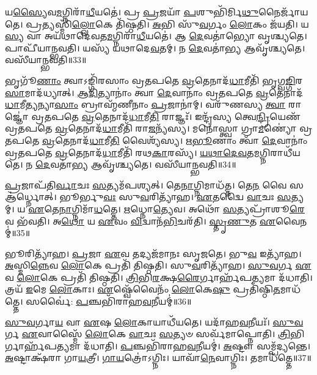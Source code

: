 𑌯\-\ul{𑌸𑍍𑌯𑍈}\-𑌵\-\ul{𑌮}\-𑌗𑍍𑌨𑌿𑌰𑌾᳴\-\ul{𑌧𑍀}\-𑌯𑌤𑍇॑।
𑌪𑍍𑌰 \ul{𑌪𑍍𑌰}\-𑌜𑌯𑌾᳴ \ul{𑌪}\-𑌶𑍁𑌭𑌿᳴𑌰𑍍𑌮𑌿\-\ul{𑌥𑍁}\-𑌨𑍈𑌰𑍍𑌜𑌾᳴𑌯𑌤𑍇।
𑌪𑍍𑌰\-\ul{𑌤𑍍𑌯}\-𑌸𑍍𑌮𑌿𑌁\-\ul{𑌲𑍍𑌲𑍋}\-𑌕𑍇 𑌤𑌿᳴𑌷𑍍𑌠𑌤𑌿।
\-\ul{𑌅}\-𑌭𑌿 𑌸𑍁᳴\-\ul{𑌵}\-𑌰𑍍𑌗𑌂 \ul{𑌲𑍋}\-𑌕𑌂 𑌜᳴𑌯𑌤𑌿।
𑌯\-\ul{𑌸𑍍𑌯} 𑌵𑌾 𑌅𑌯᳴𑌥𑌾𑌦𑍇𑌵𑌤\-\ul{𑌮}\-𑌗𑍍𑌨𑌿𑌰𑌾᳴\-\ul{𑌧𑍀}\-𑌯𑌤𑍇॑।
𑌆 \ul{𑌦𑍇}\-𑌵𑌤𑌾॑𑌭𑍍𑌯𑍋 𑌵𑍃𑌶𑍍𑌚𑍍𑌯𑌤𑍇।
𑌪𑌾𑌪𑍀᳴𑌯𑌾𑌨𑍍𑌭𑌵𑌤𑌿।
𑌯𑌸𑍍𑌯᳴ 𑌯𑌥𑌾𑌦𑍇\-\ul{𑌵}\-𑌤𑌮𑍍।
𑌨 \ul{𑌦𑍇}\-𑌵𑌤𑌾॑\-\ul{𑌭𑍍𑌯} 𑌆𑌵𑍃᳴𑌶𑍍𑌚𑍍𑌯𑌤𑍇।
𑌵𑌸𑍀᳴𑌯𑌾𑌨𑍍𑌭𑌵𑌤𑌿॥33॥

𑌭𑍃𑌗𑍂᳴\-\ul{𑌣𑌾𑌂} 𑌤𑍍𑌵𑌾\-𑌽𑌙𑍍𑌗𑌿᳴𑌰𑌸𑌾𑌂 𑌵𑍍𑌰𑌤𑌪𑌤𑍇 \ul{𑌵𑍍𑌰}\-𑌤𑍇𑌨𑌾𑌦᳴\-\ul{𑌧𑌾}\-𑌮𑍀𑌤𑌿᳴ 𑌭𑍃𑌗𑍍𑌵\-\ul{𑌙𑍍𑌗𑌿}\-𑌰\-\ul{𑌸𑌾}\-\-𑌮𑌾𑌦᳴𑌧𑍍𑌯𑌾𑌤𑍍।
\-\ul{𑌆}\-\-\ul{𑌦𑌿}\-𑌤𑍍𑌯𑌾𑌨𑌾𑌂॑ 𑌤𑍍𑌵𑌾 \ul{𑌦𑍇}\-𑌵𑌾𑌨𑌾𑌂॑ 𑌵𑍍𑌰𑌤𑌪𑌤𑍇 \ul{𑌵𑍍𑌰}\-𑌤𑍇𑌨𑌾𑌦᳴\-\ul{𑌧𑌾}\-𑌮𑍀\-\-\ul{𑌤𑍍𑌯}\-𑌨𑍍𑌯𑌾\-\ul{𑌸𑌾𑌂} 𑌬𑍍𑌰𑌾𑌹𑍍𑌮᳴𑌣𑍀𑌨𑌾𑌂 \ul{𑌪𑍍𑌰}\-𑌜𑌾𑌨𑌾॑𑌮𑍍।
𑌵𑌰𑍁᳴𑌣𑌸𑍍𑌯 \ul{𑌤𑍍𑌵𑌾} 𑌰𑌾𑌜𑍍𑌞𑍋॑ 𑌵𑍍𑌰𑌤𑌪𑌤𑍇 \ul{𑌵𑍍𑌰}\-𑌤𑍇𑌨𑌾𑌦᳴\-\ul{𑌧𑌾}\-𑌮𑍀\-\ul{𑌤𑌿} 𑌰𑌾𑌜𑍍𑌞𑌃᳴।
𑌇𑌨𑍍𑌦𑍍𑌰᳴𑌸𑍍𑌯 𑌤𑍍𑌵𑍇\-\ul{𑌨𑍍𑌦𑍍𑌰𑌿}\-𑌯𑍇𑌣᳴ 𑌵𑍍𑌰𑌤𑌪𑌤𑍇 \ul{𑌵𑍍𑌰}\-𑌤𑍇𑌨𑌾𑌦᳴\-\ul{𑌧𑌾}\-𑌮𑍀𑌤𑌿᳴ 𑌰𑌾\-\ul{𑌜}\-𑌨𑍍𑌯᳴𑌸𑍍𑌯।
𑌮𑌨𑍋॑𑌸𑍍𑌤𑍍𑌵𑌾 𑌗𑍍𑌰𑌾\-\ul{𑌮}\-𑌣𑍍𑌯𑍋॑ 𑌵𑍍𑌰𑌤𑌪𑌤𑍇 \ul{𑌵𑍍𑌰}\-𑌤𑍇𑌨𑌾𑌦᳴\-\ul{𑌧𑌾}\-𑌮𑍀\-\ul{𑌤𑌿} 𑌵𑍈𑌶𑍍𑌯᳴𑌸𑍍𑌯।
\-\ul{𑌋}\-\-\ul{𑌭𑍂}\-𑌣𑌾𑌂 𑌤𑍍𑌵𑌾᳴ \ul{𑌦𑍇}\-𑌵𑌾𑌨𑌾𑌂॑ 𑌵𑍍𑌰𑌤𑌪𑌤𑍇 \ul{𑌵𑍍𑌰}\-𑌤𑍇𑌨𑌾𑌦᳴\-\ul{𑌧𑌾}\-𑌮𑍀𑌤𑌿᳴ 𑌰𑌥\-\ul{𑌕𑌾}\-𑌰𑌸𑍍𑌯᳴।
\-\ul{𑌯}\-\-\ul{𑌥𑌾}\-\-\ul{𑌦𑍇}\-\-\ul{𑌵}\-𑌤\-\ul{𑌮}\-𑌗𑍍𑌨𑌿𑌰𑌾𑌧𑍀᳴𑌯𑌤𑍇।
𑌨 \ul{𑌦𑍇}\-𑌵𑌤𑌾॑\-\ul{𑌭𑍍𑌯} 𑌆𑌵𑍃᳴𑌶𑍍𑌚𑍍𑌯𑌤𑍇।
𑌵𑌸𑍀᳴𑌯𑌾𑌨𑍍𑌭𑌵𑌤𑌿॥34॥\anuvakamend[\-\ul{𑌧𑍍𑌯𑌾}\-\-\ul{𑌯}\-\-\ul{𑌤𑌿} 𑌵𑍈 𑌰𑌾\-\ul{𑌤𑍍𑌰𑌿}\-𑌶𑍍𑌚𑌾𑌵᳴ 𑌰𑍁𑌨𑍍𑌧𑍇 𑌭𑌵𑌿\-\ul{𑌷𑍍𑌯}\-𑌨𑍍𑌤𑍀𑌤𑍍𑌯᳴𑌬𑍍𑌰𑌵𑍀𑌜𑍍𑌜\-\ul{𑌨𑌿}\-𑌷𑍍𑌯𑌸𑍇᳴\-𑌽𑌜\-\ul{𑌯}\-𑌦𑍍𑌵𑌸𑍀᳴𑌯𑌾𑌨𑍍𑌭𑌵\-\ul{𑌤𑌿} 𑌨𑌵᳴ 𑌚]

\-\ul{𑌪𑍍𑌰}\-𑌜𑌾𑌪᳴𑌤𑌿\-\ul{𑌰𑍍𑌵𑌾}\-𑌚𑌃 \ul{𑌸}\-𑌤𑍍𑌯𑌮᳴𑌪𑌶𑍍𑌯𑌤𑍍।
𑌤𑍇\-\ul{𑌨𑌾}\-𑌗𑍍𑌨𑌿𑌮𑌾𑌧᳴𑌤𑍍𑌤।
𑌤𑍇\-\ul{𑌨} 𑌵𑍈 𑌸 𑌆॑𑌰𑍍𑌧𑍍𑌨𑍋𑌤𑍍।
𑌭𑍂𑌰𑍍𑌭𑍁\-\ul{𑌵𑌃} 𑌸𑍁\-\ul{𑌵}\-𑌰𑌿𑌤𑍍𑌯𑌾᳴𑌹।
\-\ul{𑌏}\-𑌤𑌦𑍍𑌵𑍈 \ul{𑌵𑌾}\-𑌚𑌃 \ul{𑌸}\-𑌤𑍍𑌯𑌮𑍍।
𑌯 \ul{𑌏}\-𑌤𑍇\-\ul{𑌨𑌾}\-𑌗𑍍𑌨𑌿𑌮𑌾᳴\-\ul{𑌧}\-𑌤𑍍𑌤𑍇।
\-\ul{𑌋}\-𑌧𑍍𑌨𑍋\-\ul{𑌤𑍍𑌯𑍇}\-𑌵।
𑌅𑌥𑍋᳴ \ul{𑌸}\-𑌤𑍍𑌯𑌪𑍍𑌰𑌾᳴𑌶𑍂\-\ul{𑌰𑍇}\-𑌵 𑌭᳴𑌵𑌤𑌿।
𑌅\-\ul{𑌥𑍋} 𑌯 \ul{𑌏}\-𑌵𑌂 \ul{𑌵𑌿}\-𑌦𑍍𑌵𑌾𑌨᳴\-\ul{𑌭𑌿}\-𑌚𑌰᳴𑌤𑌿।
\-\ul{𑌸𑍍𑌤𑍃}\-\-\ul{𑌣𑍁}\-𑌤 \ul{𑌏}\-𑌵𑍈𑌨𑌮𑍍॑॥35॥

𑌭𑍂𑌰𑌿𑌤𑍍𑌯𑌾᳴𑌹।
\-\ul{𑌪𑍍𑌰}\-𑌜𑌾 \ul{𑌏}\-𑌵 𑌤𑌦𑍍𑌯𑌜᳴𑌮𑌾𑌨𑌃 𑌸𑍃𑌜𑌤𑍇।
𑌭𑍁\-\ul{𑌵} 𑌇𑌤𑍍𑌯𑌾᳴𑌹।
\-\ul{𑌅}\-𑌸𑍍𑌮𑌿\-\ul{𑌨𑍍𑌨𑍇}\-𑌵 \ul{𑌲𑍋}\-𑌕𑍇 𑌪𑍍𑌰𑌤𑌿᳴ 𑌤𑌿𑌷𑍍𑌠𑌤𑌿।
𑌸𑍁\-\ul{𑌵}\-𑌰𑌿𑌤𑍍𑌯𑌾᳴𑌹।
\-\ul{𑌸𑍁}\-\-\ul{𑌵}\-𑌰𑍍𑌗 \ul{𑌏}\-𑌵 \ul{𑌲𑍋}\-𑌕𑍇 𑌪𑍍𑌰𑌤𑌿᳴ 𑌤𑌿𑌷𑍍𑌠𑌤𑌿।
\-\ul{𑌤𑍍𑌰𑌿}\-𑌭𑌿\-\ul{𑌰}\-𑌕𑍍𑌷\-\ul{𑌰𑍈}\-𑌰𑍍𑌗𑌾𑌰𑍍\mbox{}𑌹᳴𑌪\-\ul{𑌤𑍍𑌯}\-𑌮𑌾 𑌦᳴𑌧𑌾𑌤𑌿।
𑌤𑍍𑌰𑌯᳴ \ul{𑌇}\-𑌮𑍇 \ul{𑌲𑍋}\-𑌕𑌾𑌃।
\-\ul{𑌏}\-𑌷𑍍𑌵𑍇᳴𑌵𑍈𑌨𑌂᳴ \ul{𑌲𑍋}\-𑌕𑍇\-\ul{𑌷𑍁} 𑌪𑍍𑌰𑌤𑌿᳴\-𑌷𑍍𑌠𑌿\-\ul{𑌤}\-𑌮𑌾𑌧᳴𑌤𑍍𑌤𑍇।
𑌸𑌰𑍍𑌵𑍈॑: \ul{𑌪}\-𑌞𑍍𑌚𑌭𑌿᳴𑌰𑌾𑌹\-\ul{𑌵}\-𑌨𑍀𑌯𑌮𑍍॑॥36॥

\-\ul{𑌸𑍁}\-\-\ul{𑌵}\-𑌰𑍍𑌗𑌾\-\ul{𑌯} 𑌵𑌾 \ul{𑌏}\-𑌷 \ul{𑌲𑍋}\-𑌕𑌾𑌯𑌾𑌧𑍀᳴𑌯𑌤𑍇।
𑌯𑌦𑌾᳴𑌹\-\ul{𑌵}\-𑌨𑍀𑌯𑌃᳴।
\-\ul{𑌸𑍁}\-\-\ul{𑌵}\-𑌰𑍍𑌗 \ul{𑌏}\-𑌵𑌾𑌸𑍍𑌮𑍈᳴ \ul{𑌲𑍋}\-𑌕𑍇 \ul{𑌵𑌾}\-𑌚𑌃 \ul{𑌸}\-𑌤𑍍𑌯𑍞 𑌸𑌰𑍍𑌵᳴𑌮𑌾𑌪𑍍𑌨𑍋𑌤𑌿।
\-\ul{𑌤𑍍𑌰𑌿}\-𑌭𑌿𑌰𑍍𑌗𑌾𑌰𑍍\mbox{}𑌹᳴𑌪\-\ul{𑌤𑍍𑌯}\-𑌮𑌾 𑌦᳴𑌧𑌾𑌤𑌿।
\-\ul{𑌪}\-𑌞𑍍𑌚𑌭𑌿᳴𑌰𑌾𑌹\-\ul{𑌵}\-𑌨𑍀𑌯𑌮𑍍॑।
\-\ul{𑌅}\-𑌷𑍍𑌟𑍗 𑌸𑌮𑍍𑌪᳴𑌦𑍍𑌯𑌨𑍍𑌤𑍇।
\-\ul{𑌅}\-𑌷𑍍𑌟𑌾𑌕𑍍𑌷᳴𑌰𑌾 𑌗𑌾\-\ul{𑌯}\-𑌤𑍍𑌰𑍀।
\-\ul{𑌗𑌾}\-\-\ul{𑌯}\-𑌤𑍍𑌰𑍋॑\-𑌽𑌗𑍍𑌨𑌿𑌃।
𑌯𑌾𑌵𑌾᳴\-\ul{𑌨𑍇}\-𑌵𑌾𑌗𑍍𑌨𑌿𑌃।
𑌤𑌮𑌾𑌧᳴𑌤𑍍𑌤𑍇॥37॥

